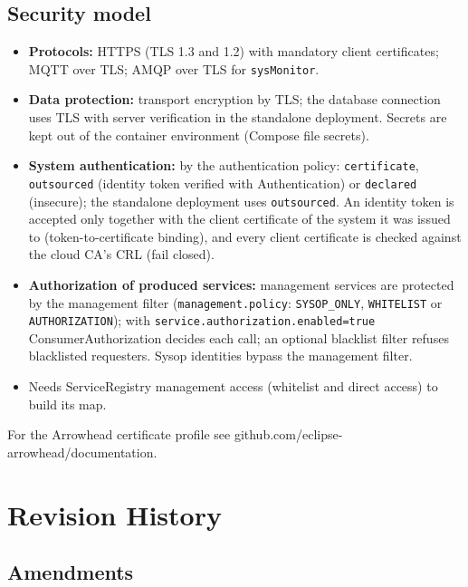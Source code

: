 \documentclass[a4paper]{arrowhead}
\begin{document}
\subsection{Security model}


\begin{itemize}
  \item \textbf{Protocols:} HTTPS (TLS 1.3 and 1.2) with mandatory client certificates; MQTT over TLS; AMQP over TLS for \texttt{sysMonitor}.
  \item \textbf{Data protection:} transport encryption by TLS; the database connection uses TLS with server verification in the standalone deployment. Secrets are kept out of the container environment (Compose file secrets).
  \item \textbf{System authentication:} by the authentication policy: \texttt{certificate}, \texttt{outsourced} (identity token verified with Authentication) or \texttt{declared} (insecure); the standalone deployment uses \texttt{outsourced}. An identity token is accepted only together with the client certificate of the system it was issued to (token-to-certificate binding), and every client certificate is checked against the cloud CA's CRL (fail closed).
  \item \textbf{Authorization of produced services:} management services are protected by the management filter (\texttt{management.policy}: \texttt{SYSOP\_ONLY}, \texttt{WHITELIST} or \texttt{AUTHORIZATION}); with \texttt{service.authorization.enabled=true} ConsumerAuthorization decides each call; an optional blacklist filter refuses blacklisted requesters. Sysop identities bypass the management filter.
  \item Needs ServiceRegistry management access (whitelist and direct access) to build its map.
\end{itemize}

For the Arrowhead certificate profile see github.com/eclipse-arrowhead/documentation.





\newpage

\section{Revision History}
\subsection{Amendments}
\end{document}
